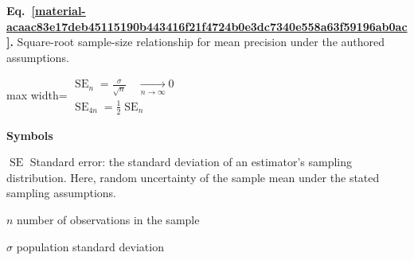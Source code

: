 \documentclass[11pt,a4paper]{article}
\begin{document}
\par\medskip
\noindent\begin{minipage}{\linewidth}
\label{material-acaac83e17deb45115190b443416f21f4724b0e3dc7340e558a63f59196ab0ac}
\noindent\textbf{Eq.~\ref*{material-acaac83e17deb45115190b443416f21f4724b0e3dc7340e558a63f59196ab0ac}.} Square-root sample-size relationship for mean precision under the authored assumptions.\par\nopagebreak
\begin{center}\begin{adjustbox}{max width=\linewidth}$\displaystyle \begin{gathered}\operatorname{SE}_n=\frac{\sigma}{\sqrt n}\quad\xrightarrow[n\to\infty]{}0\\\operatorname{SE}_{4n}=\frac12\operatorname{SE}_n\end{gathered}$\end{adjustbox}\end{center}

\par\noindent\textbf{Symbols}

\par\noindent\textbf{\(\operatorname{SE}\)} Standard error: the standard deviation of an estimator's sampling distribution. Here, random uncertainty of the sample mean under the stated sampling assumptions.

\par\noindent\textbf{\(n\)} number of observations in the sample

\par\noindent\textbf{\(σ\)} population standard deviation

\end{minipage}\par
\medskip
\end{document}
